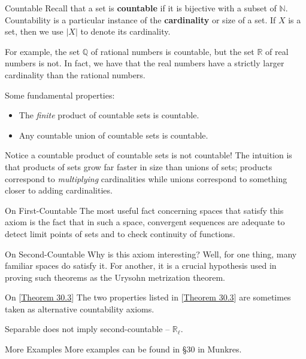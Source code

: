 \begin{remarkBox}{Countable}
    Recall that a set is \textbf{countable} if it is bijective with a subset 
    of \( \mathbb{N} \).
    Countability is a particular instance of the \textbf{cardinality} or size
    of a set.
    If \( X \) is a set, then we use \( \lvert X \rvert \) to denote its
    cardinality.

    \baseSkip

    For example, the set \( \mathbb{Q} \) of rational numbers is countable,
    but the set \( \mathbb{R} \) of real numbers is not.
    In fact, we have that the real numbers have a strictly larger cardinality
    than the rational numbers.

    \baseRule

    Some fundamental properties:
    
    \begin{itemize}
        \item The \textit{finite} product of countable sets is countable.
        \item Any countable union of countable sets is countable.
    \end{itemize}

    Notice a countable product of countable sets is not countable!
    The intuition is that products of sets grow far faster in size than
    unions of sets; products correspond to \textit{multiplying} cardinalities
    while unions correspond to something closer to adding cardinalities.
\end{remarkBox}

\begin{remarkBox}{On First-Countable}
    The most useful fact concerning spaces that satisfy this axiom is the fact
    that in such a space, convergent sequences are adequate to detect limit
    points of sets and to check continuity of functions.
\end{remarkBox}

\begin{remarkBox}{On Second-Countable}
    Why is this axiom interesting? Well, for one thing, many familiar spaces
    do satisfy it.
    For another, it is a crucial hypothesis used in proving such theorems
    as the Urysohn metrization theorem.
\end{remarkBox}

\begin{remarkBox}{On [\hyperlink{thm30.3}{Theorem 30.3}]}
    The two properties listed in [\hyperlink{thm:30.3}{Theorem 30.3}]
    are sometimes taken as alternative countability axioms.

    \baseSkip

    Separable does not imply second-countable -- \( \mathbb{R}_{ \ell } \).
\end{remarkBox}

\begin{remarkBox}{More Examples}
    More examples can be found in \S 30 in Munkres.
\end{remarkBox}